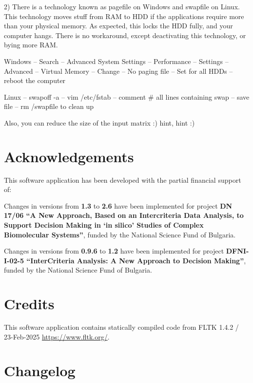 \documentclass[11pt, a4paper]{article}
\begin{document}
2) There is a technology known as pagefile on Windows and swapfile on Linux.
This technology moves stuff from RAM to HDD if the applications require more than your physical memory.
As expected, this locks the HDD fully, and your computer hangs.
There is no workaround, except deactivating this technology, or bying more RAM.

Windows -- Search -- Advanced System Settings -- Performance -- Settings -- Advanced -- Virtual Memory --
Change -- No paging file -- Set for all HDDs -- reboot the computer

Linux -- swapoff -a -- vim /etc/fstab -- comment \# all lines containing swap -- save file -- rm /swapfile to clean up

Also, you can reduce the size of the input matrix :) hint, hint :)


\section{Acknowledgements}

This software application has been developed with the partial financial support of:

Changes in versions from \textbf{1.3} to \textbf{2.6} have been implemented for
project \textbf{DN 17/06 ``A New Approach, Based on an Intercriteria Data Analysis,
to Support Decision Making in `in silico' Studies of Complex Biomolecular Systems''},
funded by the National Science Fund of Bulgaria.

Changes in versions from \textbf{0.9.6} to \textbf{1.2} have been implemented for
project \textbf{DFNI-I-02-5 ``InterCriteria Analysis: A New Approach to Decision Making''},
funded by the National Science Fund of Bulgaria.


\section{Credits}

This software application contains statically compiled code from
FLTK 1.4.2 / 23-Feb-2025 \url{https://www.fltk.org/}.


\section{Changelog}
\end{document}
